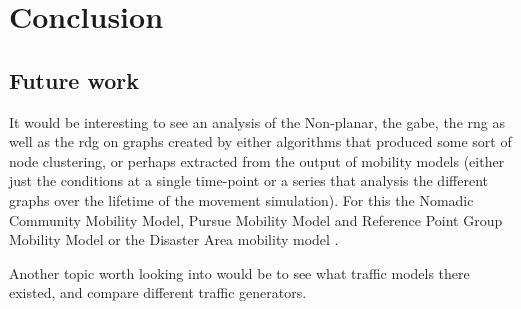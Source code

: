 \section{Conclusion}
\label{section:conclusion}





\subsection{Future work}
\label{section:future_work}
It would be interesting to see an analysis of the Non-planar, the \ac{gabe}, the \ac{rng} as well as the \ac{rdg} on graphs created by either algorithms that produced some sort of node clustering, or perhaps extracted from the output of mobility models (either just the conditions at a single time-point or a series that analysis the different graphs over the lifetime of the movement simulation). For this the Nomadic Community Mobility Model, Pursue Mobility Model and Reference Point Group Mobility Model \cite{MobilityAdHocResearch} or the Disaster Area mobility model \cite{disasterArea}.

Another topic worth looking into would be to see what traffic models there existed, and compare different traffic generators.
